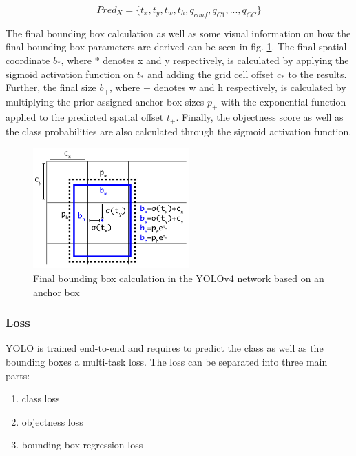 \begin{equation}
    Pred_{X} = \{t_x, t_y, t_w, t_h, q_{conf}, q_{C1},...,q_{CC}\}
\end{equation}

The final bounding box calculation as well as some visual information on how the final bounding box parameters are derived can be seen in fig. \ref{fig:bbox_calculation}.
The final spatial coordinate $b_*$, where $*$ denotes x and y respectively, is calculated by applying the sigmoid activation function on $t_*$ and adding the grid cell offset $c_*$ to the results.
Further, the final size $b_+$, where $+$ denotes w and h respectively, is calculated by multiplying the prior assigned anchor box sizes $p_+$ with the exponential function applied to the predicted spatial offset $t_+$.
Finally, the objectness score as well as the class probabilities are also calculated through the sigmoid activation function.

\begin{figure}
\begin{center}
    \includegraphics[width=6cm]{imgs/bbox_calculation.png}
    \caption{Final bounding box calculation in the YOLOv4 network based on an anchor box \cite{yolov2}}
    \label{fig:bbox_calculation}
\end{center}
\end{figure}

\subsubsection{Loss}

\ac{YOLO} is trained end-to-end and requires to predict the class as well as the bounding boxes a multi-task loss.
The loss can be separated into three main parts:

\begin{enumerate}
    \item class loss
    \item objectness loss
    \item bounding box regression loss
\end{enumerate}

